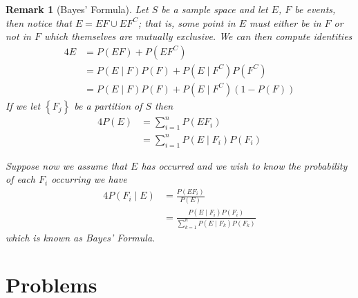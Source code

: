 \documentclass[11pt, oneside]{book}   	%
\newtheorem{remark}{Remark}
\begin{document}
\begin{remark}[Bayes' Formula]
	Let $S$ be a sample space and let $E$, $F$ be events, then notice that $E=EF \cup EF^C$; that is, some point in $E$ must either be in $F$ or not in $F$ which themselves are mutually exclusive. We can then compute identities 
	\begin{alignat}{4}
		E&=P(EF)+P\left(EF^C\right) \\
			&=P(E\mid F)P(F)+P\left(E\mid F^C\right)P\left(F^C\right) \\
			&=P(E\mid F)P(F)+P\left(E\mid F^C\right)\left(1-P(F)\right)
	\end{alignat}
	If we let $\left\{F_j\right\}$ be a partition of $S$ then 
	\begin{alignat}{4}
		P(E)&=\sum_{i=1}^nP(EF_i) \\
			&=\sum_{i=1}^nP(E\mid F_i)P(F_i)
	\end{alignat} 
	
	Suppose now we assume that $E$ has occurred and we wish to know the probability of each $F_i$ occurring we have 
	\begin{alignat}{4}
		P(F_i\mid E)&=\frac{P(EF_i)}{P(E)} \\
			&=\frac{P(E\mid F_i)P(F_i)}{\sum_{k=1}^nP(E\mid F_k)P(F_k)}
	\end{alignat}
	which is known as Bayes' Formula. 
\end{remark}

\section{Problems}
\end{document}
